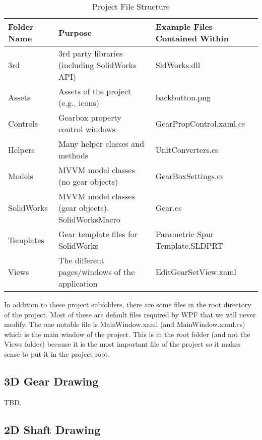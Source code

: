 \begin{doublespace}
\begin{table}[htb]
    \centering
    \caption{Project File Structure}
    \label{tab:file_structure}
    \begin{tabularx}{\textwidth}{||Y|Y|Y||}
        \hline Folder Name & Purpose & Example Files Contained Within \\ \hline \hline
        3rd & 3rd party libraries (including SolidWorks API) & SldWorks.dll \\ \hline
        Assets & Assets of the project (e.g., icons) & backbutton.png \\ \hline
        Controls & Gearbox property control windows & GearPropControl.xaml.cs \\ \hline
        Helpers & Many helper classes and methods & UnitConverters.cs \\ \hline
        Models & MVVM model classes (no gear objects) & GearBoxSettings.cs \\ \hline
        SolidWorks & MVVM model classes (gear objects), SolidWorksMacro & Gear.cs \\ \hline
        Templates & Gear template files for SolidWorks & Parametric Spur Template.SLDPRT \\ \hline
        Views & The different pages/windows of the application & EditGearSetView.xaml \\ \hline
    \end{tabularx}
\end{table}

In addition to these project subfolders, there are some files in the root directory of the project. Most of these are default files required by WPF that we will never modify. The one notable file is MainWindow.xaml (and MainWindow.xaml.cs) which is the main window of the project. This is in the root folder (and not the Views folder) because it is the most important file of the project so it makes sense to put it in the project root.

\subsection{3D Gear Drawing}
TBD.

\subsection{2D Shaft Drawing}




\end{doublespace}